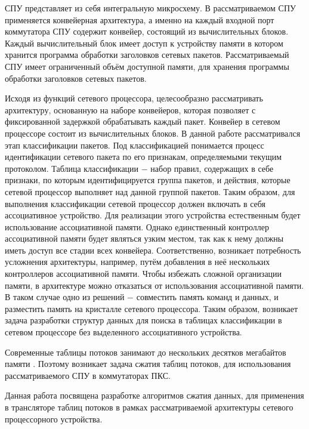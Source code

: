 \documentclass[oneside,final,12pt]{extarticle}
\begin{document}
        СПУ представляет из себя интегральную микросхему. В рассматриваемом СПУ применяется конвейерная архитектура,
        а именно на каждый входной порт коммутатора СПУ содержит конвейер, состоящий из вычислительных блоков. Каждый вычислительный блок имеет доступ к 
        устройству памяти в котором хранится программа обработки заголовков сетевых пакетов. Рассматриваемый СПУ имеет ограниченный объём доступной
        памяти, для хранения программы обработки заголовков сетевых пакетов.
        
        Исходя из функций сетевого процессора, целесообразно рассматривать архитектуру, основанную на
        наборе конвейеров, которая позволяет с фиксированной задержкой обрабатывать каждый пакет. 
        Конвейер в сетевом процессоре состоит из вычислительных блоков. В данной работе рассматривался этап классификации пакетов. 
        Под классификацией понимается процесс идентификации сетевого пакета по его признакам, определяемыми текущим протоколом.
        Таблица классификации $-$ набор правил, содержащих в себе признаки, по которым идентифицируется группа пакетов,
        и действия, которые сетевой процессор выполняет над данной группой пакетов. 
        Таким образом, для выполнения классификации сетевой процессор должен включать в себя ассоциативное устройство. Для реализации этого устройства естественным будет использование 
        ассоциативной памяти. Однако единственный контроллер ассоциативной памяти будет являться узким местом, так как к нему должны иметь доступ все стадии всех конвейера.
        Соответственно, возникает потребность усложнения архитектуры, например, путём добавления в неё нескольких контроллеров ассоциативной памяти.
        Чтобы избежать сложной организации памяти, в архитектуре можно отказаться от использования ассоциативной памяти. 
        В таком случае одно из решений $-$ совместить память команд и данных, и разместить память на кристалле сетевого процессора.
        Таким образом, возникает задача разработки структур данных для поиска в таблицах классификации в сетевом процессоре без выделенного ассоциативного устройства.
 
        Современные таблицы потоков занимают до нескольких десятков мегабайтов памяти \cite{rottenstreich2016optimal}. Поэтому возникает задача сжатия таблиц потоков,
        для использования рассматриваемого СПУ в коммутаторах ПКС.

        Данная работа посвящена разработке алгоритмов сжатия данных, для применения в трансляторе таблиц
        потоков в рамках рассматриваемой архитектуры сетевого процессорного устройства.
\end{document}
